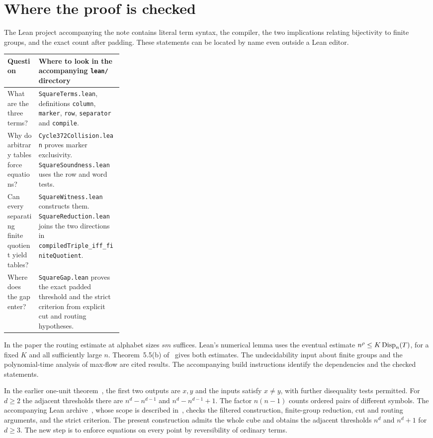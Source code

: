 \documentclass[a4paper,12pt]{article}
\newcommand{\stephead}[1]{\par\smallskip{\large\bfseries\color{inkblue}#1}\par\nobreak}
\begin{document}
\section{Where the proof is checked}\label{verification}
The Lean project accompanying the note contains literal term syntax, the compiler, the two implications relating bijectivity to finite groups, and the exact count after padding. These statements can be located by name even outside a Lean editor.
\begin{center}\small
\begin{tabularx}{\linewidth}{@{}>{\raggedright\arraybackslash}p{0.27\linewidth}>{\raggedright\arraybackslash}X@{}}
\toprule Question & Where to look in the accompanying \texttt{lean/} directory\\ \midrule
What are the three terms? & \texttt{SquareTerms.lean}, definitions \texttt{column}, \texttt{marker}, \texttt{row}, \texttt{separator} and \texttt{compile}.\\[3pt]
Why do arbitrary tables force equations? & \texttt{Cycle372Collision.lean} proves marker exclusivity. \texttt{SquareSoundness.lean} uses the row and word tests.\\[3pt]
Can every separating finite quotient yield tables? & \texttt{SquareWitness.lean} constructs them. \texttt{SquareReduction.lean} joins the two directions in \texttt{compiledTriple\_iff\_finiteQuotient}.\\[3pt]
Where does the gap enter? & \texttt{SquareGap.lean} proves the exact padded threshold and the strict criterion from explicit cut and routing hypotheses.\\
\bottomrule
\end{tabularx}\end{center}
In the paper the routing estimate at alphabet sizes \(sm\) suffices. Lean's numerical lemma uses the eventual estimate \(n^\rho\le K\,\mathrm{Disp}_n(T)\), for a fixed \(K\) and all sufficiently large \(n\). Theorem~5.5(b) of~\cite{TC} gives both estimates. The undecidability input about finite groups and the polynomial-time analysis of max-flow are cited results. The accompanying build instructions identify the dependencies and the checked statements.

\stephead{How this fits with the earlier one-unit paper}
In the earlier one-unit theorem~\cite[Theorem~1.1]{OneUnit}, the first two outputs are \(x,y\) and the inputs satisfy \(x\ne y\), with further disequality tests permitted. For \(d\ge2\) the adjacent thresholds there are \(n^d-n^{d-1}\) and \(n^d-n^{d-1}+1\). The factor \(n(n-1)\) counts ordered pairs of different symbols. The accompanying Lean archive~\cite{EarlierLean}, whose scope is described in~\cite[\S8]{OneUnit}, checks the filtered construction, finite-group reduction, cut and routing arguments, and the strict criterion. The present construction admits the whole cube and obtains the adjacent thresholds \(n^d\) and \(n^d+1\) for \(d\ge3\). The new step is to enforce equations on every point by reversibility of ordinary terms.
\end{document}
